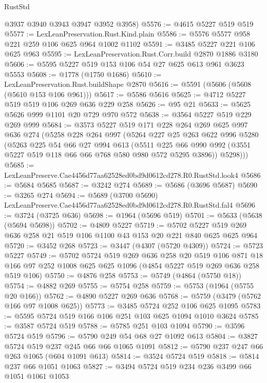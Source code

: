 \begin{lexlean}{RustStd}
\begin{coremodule}
      @3937
      @3940
      @3943
      @3947
      @3952
      @3958)
@5576 := @4615 @5227 @519 @519
@5577 := LexLeanPreservation.Rust.Kind.plain
@5586 := @5576 @5577 @958 @221 @259 @106 @625 @964 @1002 @1102
@5591 := @3485 @5227 @221 @106 @625 @963
@5595 := LexLeanPreservation.Rust.Corr.build @2870 @1886 @3180
@5606 := @5595 @5227 @519 @153 @106 @54 @27 @625 @613 @961 @3623 @5553
@5608 := @1778 (@1750 @1686)
@5610 := LexLeanPreservation.Rust.buildShape @2870
@5616 := @5591 (@5606 (@5608 (@5610 @153 @106 @961)))
@5617 := @5586 @5616
@5625 := @4712 @5227 @519 @519 @106 @269 @636 @229 @258
@5626 := @95 @21
@5633 := @5625 @5626 @999 @1101 @20 @729 @970 @572
@5638 := @3564 @5227 @519 @229 @269 @999
@5684 := @3573
    @5227
    @519
    @171
    @228
    @264
    @269
    @625
    @997
    @636
    @274
    (@5258
      @228
      @264
      @997
      (@5264
        @227
        @25
        @263
        @622
        @996
        @5280
        (@5263
          @225
          @54
          @66
          @27
          @994
          @613
          (@5511 @225 @66 @990 @992 (@3551 @5227 @519 @118 @66 @66 @768 @580 @980 @572 @5295 @3896))
          @5298)))
@5685 := LexLeanPreserve.Cae4456d77aa62528ed0bd9d0612cd278.R0.RustStd.look4
@5686 := @5684 @5685
@5687 := @3242 @274
@5689 := @5686 (@3696 @5687)
@5690 := @3265 @274
@5694 := @5689 (@3700 @5690) LexLeanPreserve.Cae4456d77aa62528ed0bd9d0612cd278.R0.RustStd.fal4
@5696 := @3724 (@3725 @636)
@5698 := @1964 (@5696 @519)
@5701 := @5633 (@5638 (@5694 @5698))
@5702 := @4809 @5227
@5719 := @5702 @5227 @519 @269 @636 @258 @21 @519 @106 @1100 @43 @153 @20 @221 @840 @625 @625 @964
@5720 := @3452 @268
@5723 := @3447 (@4307 (@5720 @4309))
@5724 := @5723 @5227
@5749 := @5702
    @5724
    @519
    @269
    @636
    @258
    @20
    @519
    @106
    @871
    @18
    @166
    @97
    @252
    @1008
    @625
    @625
    @1096
    (@4854 @5227 @519 @269 @636 @258 @519 @106)
@5750 := @4876 @258
@5753 := @5749 (@4864 (@5750 @18))
@5754 := @4882 @269
@5755 := @5754 @258
@5759 := @5753 (@1964 (@5755 @20 @166))
@5762 := @4890 @5227 @269 @636
@5768 := @5759 (@3479 (@5762 @166 @97 @1008 @625))
@5773 := @3485 @5724 @252 @106 @625 @1095
@5783 := @5595 @5724 @519 @166 @106 @251 @103 @625 @1094 @1010 @3624
@5785 := @3587 @5724 @519
@5788 := @5785 @251 @103 @1094
@5790 := @3596 @5724 @519
@5796 := @5790 @249 @54 @68 @27 @1092 @613
@5804 := @3827 @5724 @519 @237 @245 @66 @66 @1065 @1091
@5812 := @5790 @237 @247 @66 @263 @1065 (@604 @1091 @613)
@5814 := @3524 @5724 @519
@5818 := @5814 @237 @66 @1051 @1063
@5827 := @3494 @5724 @519 @234 @236 @3499 @66 @1051 @1061 @1053

\end{coremodule}
\end{lexlean}
